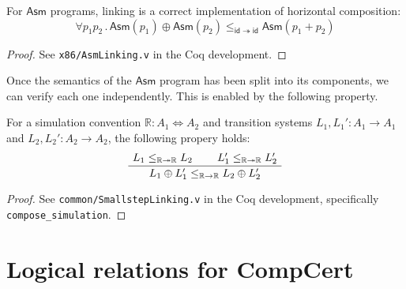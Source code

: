 \documentclass[acmsmall,authordraft]{acmart}
\newcommand{\kw}[1]{\ensuremath{ \mathsf{#1} }}
\begin{document}
\begin{theorem} \label{thm:asmlinking} %
For \kw{Asm} programs,
linking is a correct implementation of
horizontal composition:
\[
    \forall p_1 p_2 \,.\,
      \kw{Asm}(p_1) \oplus \kw{Asm}(p_2)
      \le_{\kw{id} \twoheadrightarrow \kw{id}}
      \kw{Asm}(p_1 + p_2)
\]
\begin{proof}
See \texttt{x86/AsmLinking.v} in the Coq development.
\end{proof}
\end{theorem}

Once the semantics of the \kw{Asm} program
has been split into its components,
we can verify each one independently.
This is enabled by the following property.

\begin{theorem} \label{thm:simlinking} %
For a simulation convention
$\mathbb{R} : A_1 \Leftrightarrow A_2$
and transition systems
$L_1, L_1' : A_1 \rightarrow A_1$ and
$L_2, L_2' : A_2 \rightarrow A_2$,
the following propery holds:
\[
    \AxiomC{$L_1 \le_{\mathbb{R} \twoheadrightarrow \mathbb{R}} L_2$}
    \AxiomC{$L_1' \le_{\mathbb{R} \twoheadrightarrow \mathbb{R}} L_2'$}
    \BinaryInfC{$L_1 \oplus L_1' \le_{\mathbb{R} \rightarrow \mathbb{R}} L_2 \oplus L_2'$}
    \DisplayProof
\]
\begin{proof}
See \texttt{common/SmallstepLinking.v}
in the Coq development,
specifically \texttt{compose\_simulation}.
\end{proof}
\end{theorem}


%
%
%


\section{Logical relations for CompCert} \label{sec:cklr} %
\end{document}

